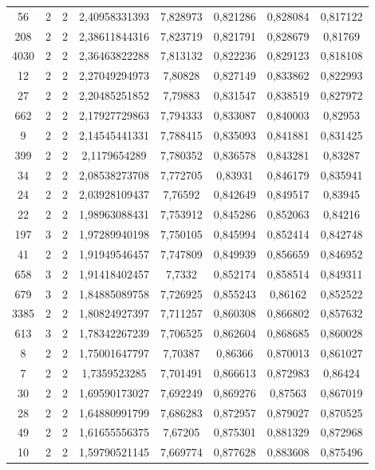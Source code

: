 \begin{longtable}{|c|c|c|c|c|c|c|c|}
56 & 2 & 2 & 2,40958331393 & 7,828973 & 0,821286 & 0,828084 & 0,817122 \\
208 & 2 & 2 & 2,38611844316 & 7,823719 & 0,821791 & 0,828679 & 0,81769 \\
4030 & 2 & 2 & 2,36463822288 & 7,813132 & 0,822236 & 0,829123 & 0,818108 \\
12 & 2 & 2 & 2,27049294973 & 7,80828 & 0,827149 & 0,833862 & 0,822993 \\
27 & 2 & 2 & 2,20485251852 & 7,79883 & 0,831547 & 0,838519 & 0,827972 \\
662 & 2 & 2 & 2,17927729863 & 7,794333 & 0,833087 & 0,840003 & 0,82953 \\
9 & 2 & 2 & 2,14545441331 & 7,788415 & 0,835093 & 0,841881 & 0,831425 \\
399 & 2 & 2 & 2,1179654289 & 7,780352 & 0,836578 & 0,843281 & 0,83287 \\
34 & 2 & 2 & 2,08538273708 & 7,772705 & 0,83931 & 0,846179 & 0,835941 \\
24 & 2 & 2 & 2,03928109437 & 7,76592 & 0,842649 & 0,849517 & 0,83945 \\
22 & 2 & 2 & 1,98963088431 & 7,753912 & 0,845286 & 0,852063 & 0,84216 \\
197 & 3 & 2 & 1,97289940198 & 7,750105 & 0,845994 & 0,852414 & 0,842748 \\
41 & 2 & 2 & 1,91949546457 & 7,747809 & 0,849939 & 0,856659 & 0,846952 \\
658 & 3 & 2 & 1,91418402457 & 7,7332 & 0,852174 & 0,858514 & 0,849311 \\
679 & 3 & 2 & 1,84885089758 & 7,726925 & 0,855243 & 0,86162 & 0,852522 \\
3385 & 2 & 2 & 1,80824927397 & 7,711257 & 0,860308 & 0,866802 & 0,857632 \\
613 & 3 & 2 & 1,78342267239 & 7,706525 & 0,862604 & 0,868685 & 0,860028 \\
8 & 2 & 2 & 1,75001647797 & 7,70387 & 0,86366 & 0,870013 & 0,861027 \\
7 & 2 & 2 & 1,7359523285 & 7,701491 & 0,866613 & 0,872983 & 0,86424 \\
30 & 2 & 2 & 1,69590173027 & 7,692249 & 0,869276 & 0,87563 & 0,867019 \\
28 & 2 & 2 & 1,64880991799 & 7,686283 & 0,872957 & 0,879027 & 0,870525 \\
49 & 2 & 2 & 1,61655556375 & 7,67205 & 0,875301 & 0,881329 & 0,872968 \\
10 & 2 & 2 & 1,59790521145 & 7,669774 & 0,877628 & 0,883608 & 0,875496 \\

\end{longtable}
